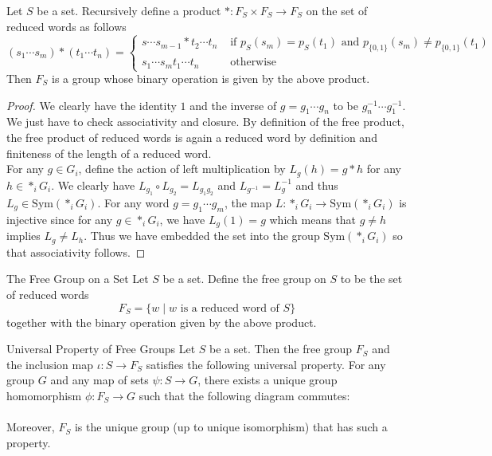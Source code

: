 \documentclass[a4paper]{article}
\begin{document}
\begin{prp}{}{} Let $S$ be a set. Recursively define a product $\ast:F_S\times F_S\to F_S$ on the set of reduced words as follows $$(s_1\cdots s_m)\ast(t_1\cdots t_n)=\begin{cases}
s\cdots s_{m-1}\ast t_2\cdots t_n & \text{ if }p_S(s_m)=p_S(t_1)\text{ and }p_{\{0,1\}}(s_m)\neq p_{\{0,1\}}(t_1)\\
s_1\cdots s_mt_1\cdots t_n& \text{ otherwise }
\end{cases}$$
Then $F_S$ is a group whose binary operation is given by the above product. 
\begin{proof}
We clearly have the identity $1$ and the inverse of $g=g_1\cdots g_n$ to be $g_n^{-1}\cdots g_1^{-1}$. We just have to check associativity and closure. By definition of the free product, the free product of reduced words is again a reduced word by definition and finiteness of the length of a reduced word. \\
For any $g\in G_i$, define the action of left multiplication by $L_g(h)=g\ast h$ for any $h\in\ast_iG_i$. We clearly have $L_{g_1}\circ L_{g_2}=L_{g_1g_2}$ and $L_{g^{-1}}=L_g^{-1}$ and thus $L_g\in\text{Sym}(\ast_iG_i)$. For any word $g=g_1\cdots g_m$, the map $L:\ast_iG_i\to\text{Sym}(\ast_iG_i)$ is injective since for any $g\in\ast_iG_i$, we have $L_g(1)=g$ which means that $g\neq h$ implies $L_g\neq L_h$. Thus we have embedded the set into the group $\text{Sym}(\ast_iG_i)$ so that associativity follows. 
\end{proof}
\end{prp}

\begin{defn}{The Free Group on a Set}{} Let $S$ be a set. Define the free group on $S$ to be the set of reduced words $$F_S=\{w\;|\;w\text{ is a reduced word of }S\}$$ together with the binary operation given by the above product. 
\end{defn}

\begin{prp}{Universal Property of Free Groups}{} Let $S$ be a set. Then the free group $F_S$ and the inclusion map $\iota:S\to F_S$ satisfies the following universal property. For any group $G$ and any map of sets $\psi:S\to G$, there exists a unique group homomorphism $\phi:F_S\to G$ such that the following diagram commutes: \\
 \\
Moreover, $F_S$ is the unique group (up to unique isomorphism) that has such a property. 
\end{prp}
\end{document}

